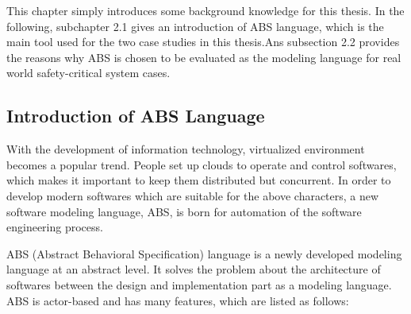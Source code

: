 \documentclass[article,dr=phil,type=msc,colorback,accentcolor=tud9c]{tudthesis}
\begin{document}
  This chapter simply introduces some background knowledge for this thesis. In the following, subchapter 2.1 gives an introduction of ABS language, which is the main tool used for the two case studies in this thesis.Ans subsection 2.2 provides the reasons why ABS is chosen to be evaluated as the modeling language for real world safety-critical system cases.
  
  \subsection{Introduction of ABS Language}
  
  With the development of information technology, virtualized environment becomes a popular trend. People set up clouds to operate and control softwares, which makes it important to keep them distributed but concurrent. In order to develop modern softwares which are suitable for the above characters, a new software modeling language, ABS, is born for automation of the software engineering process.
  
  ABS (Abstract Behavioral Specification) language is a newly developed modeling language at an abstract level. It solves the problem about the architecture of softwares between the design and implementation part as a modeling language. ABS is actor-based and has many features, which are listed as follows:
  
\end{document}
